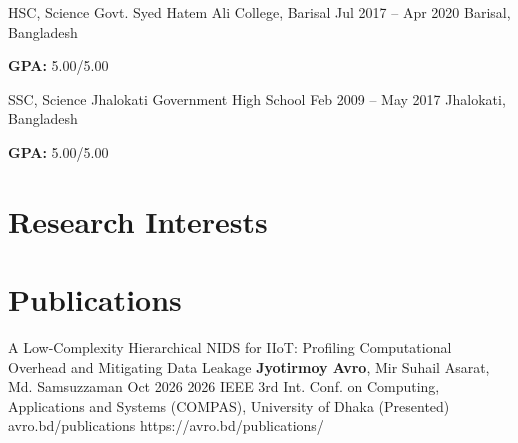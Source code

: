 \documentclass[11pt, a4paper]{article}
\begin{document}
\cvEducation
    {HSC, Science}
    {Govt. Syed Hatem Ali College, Barisal}
    {Jul 2017 -- Apr 2020}
    {Barisal, Bangladesh}
    {
        \item \textbf{GPA:} 5.00/5.00
    }

\cvEducation
    {SSC, Science}
    {Jhalokati Government High School}
    {Feb 2009 -- May 2017}
    {Jhalokati, Bangladesh}
    {
        \item \textbf{GPA:} 5.00/5.00
    }


\section{Research Interests}


\section{Publications}
\cvPublication
    {A Low-Complexity Hierarchical NIDS for IIoT: Profiling Computational Overhead and Mitigating Data Leakage}
    {\textbf{Jyotirmoy Avro}, Mir Suhail Asarat, Md. Samsuzzaman}
    {Oct 2026}
    {2026 IEEE 3rd Int. Conf. on Computing, Applications and Systems (COMPAS), University of Dhaka (Presented)}
    {avro.bd/publications}
    {https://avro.bd/publications/}

\end{document}
